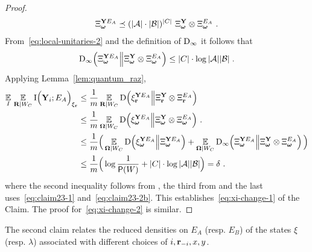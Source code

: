 \begin{proof}
\begin{align}
\label{eq:local-unitaries-2}
\Xi_{\boldsymbol{\omega}}^{\mathbf{Y} E_A} \preceq (|\mathcal{A}|\cdot |\mathcal{B}|)^{|C|} \,\, \Xi_{{\boldsymbol{\omega}}}^{\mathbf{Y}} \otimes \Xi_{{\boldsymbol{\omega}}}^{E_A}~.
\end{align}
 
	From~\eqref{eq:local-unitaries-2} and the definition of $\mathrm{D}_\infty$ it follows that 
	\begin{equation}\label{eq:claim23-2b}
	\mathrm{D}_\infty \Big (\Xi_{{\boldsymbol{\omega}}}^{\mathbf{Y} E_A} \Big \| \Xi_{{\boldsymbol{\omega}}}^{\mathbf{Y}} \otimes \Xi_{{\boldsymbol{\omega}}}^{E_A} \Big ) \leq |C| \cdot \log |\mathcal{A}| |\mathcal{B}|\;.
	\end{equation}
Applying Lemma~\ref{lem:quantum_raz},
\begin{align*}
		\operatorname*{\mathbb{E}}_I \,  \operatorname*{\mathbb{E}}_{\mathbf{R} | W_C} \mathrm{I} \Big (\mathbf{Y}_i ; E_A\Big )_{\xi_{\mathbf{r}}} &\leq 		\frac{1}{m} \operatorname*{\mathbb{E}}_{\mathbf{R} | W_C} \mathrm{D} \Big (\xi_{\mathbf{r}}^{\mathbf{Y} E_A} \Big \| \Xi_{\mathbf{r}}^{\mathbf{Y}} \otimes \Xi_{\mathbf{r}}^{E_A} \Big )\notag\\
		&\leq \frac{1}{m} \operatorname*{\mathbb{E}}_{{\boldsymbol{\Omega}} | W_C} \mathrm{D} \Big (\xi_{{\boldsymbol{\omega}}}^{\mathbf{Y} E_A} \Big \| \Xi_{{\boldsymbol{\omega}}}^{\mathbf{Y}} \otimes \Xi_{{\boldsymbol{\omega}}}^{E_A} \Big )~.\notag \\
		&\leq 		\frac{1}{m} \Big(\operatorname*{\mathbb{E}}_{{\boldsymbol{\Omega}} | W_C} \mathrm{D} \Big (\xi_{{\boldsymbol{\omega}}}^{\mathbf{Y} E_A} \Big \| \Xi_{{\boldsymbol{\omega}}}^{\mathbf{Y} E_A} \Big) + \operatorname*{\mathbb{E}}_{{\boldsymbol{\Omega}} | W_C} \mathrm{D}_\infty \Big (\Xi_{{\boldsymbol{\omega}}}^{\mathbf{Y} E_A} \Big \| \Xi_{{\boldsymbol{\omega}}}^{\mathbf{Y}} \otimes \Xi_{{\boldsymbol{\omega}}}^{E_A} \Big) \, \Big)\notag\\
		&\leq \frac{1}{m}\Big(\log \frac{1}{\mathsf{P}(W)} +  |C| \cdot \log |\mathcal{A}| |\mathcal{B}|\Big) = \delta~.
\end{align*}
where the second inequality follows from , the third from  and the last uses~\eqref{eq:claim23-1} and~\eqref{eq:claim23-2b}. This establishes~\eqref{eq:xi-change-1} of the Claim. The proof for~\eqref{eq:xi-change-2} is similar.
\end{proof}

The second claim relates the reduced densities on $E_A$ (resp. $E_B$) of the states $\xi$ (resp. $\lambda$) associated with different choices of $i,\mathbf{r}_{-i},x,y$. 


